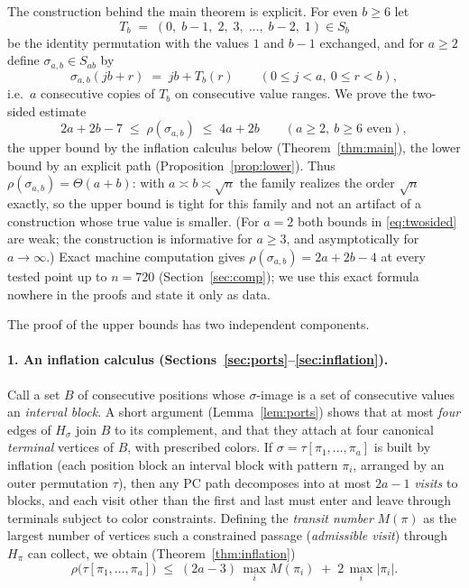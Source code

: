 \documentclass[11pt]{article}
\theoremstyle{definition}
\begin{document}
The construction behind the main theorem is explicit. For even $b\ge 6$ let
\[
T_b \;=\; (0,\; b{-}1,\; 2,\; 3,\; \dots,\; b{-}2,\; 1) \in S_b
\]
be the identity permutation with the values $1$ and $b-1$ exchanged, and for $a \ge 2$
define $\sigma_{a,b} \in S_{ab}$ by
\[
\sigma_{a,b}(jb + r) \;=\; jb + T_b(r) \qquad (0 \le j < a,\ 0 \le r < b),
\]
i.e.\ $a$ consecutive copies of $T_b$ on consecutive value ranges. We prove the
two-sided estimate
\begin{equation}\label{eq:twosided}
2a + 2b - 7 \;\le\; \rho(\sigma_{a,b}) \;\le\; 4a + 2b
\qquad (a \ge 2,\ b \ge 6 \text{ even}),
\end{equation}
the upper bound by the inflation calculus below
(Theorem~\ref{thm:main}), the lower bound by an
explicit path (Proposition~\ref{prop:lower}). Thus $\rho(\sigma_{a,b}) = \Theta(a+b)$:
with $a \asymp b \asymp \sqrt n$ the family realizes the order $\sqrt n$ exactly, so
the upper bound is tight for this family and not an artifact of a construction whose
true value is smaller. (For $a = 2$ both bounds in \eqref{eq:twosided} are weak; the
construction is informative for $a \ge 3$, and asymptotically for $a \to \infty$.)
Exact machine computation gives $\rho(\sigma_{a,b}) = 2a + 2b - 4$ at every tested
point up to $n = 720$ (Section~\ref{sec:comp}); we use this exact formula nowhere in
the proofs and state it only as data.

The proof of the upper bounds has two independent components.

\paragraph{1. An inflation calculus (Sections~\ref{sec:ports}--\ref{sec:inflation}).}
Call a set $B$ of consecutive positions whose $\sigma$-image is a set of consecutive
values an \emph{interval block}. A short argument (Lemma~\ref{lem:ports}) shows that at
most \emph{four} edges of $H_\sigma$ join $B$ to its complement, and that they attach
at four canonical \emph{terminal} vertices of $B$, with prescribed colors. If
$\sigma = \tau[\pi_1,\dots,\pi_a]$ is built by inflation (each position block an
interval block with pattern $\pi_i$, arranged by an outer permutation $\tau$), then any
PC path decomposes into at most $2a-1$ \emph{visits} to blocks, and each visit other
than the first and last must enter and leave through terminals subject to color
constraints. Defining the \emph{transit number} $M(\pi)$ as the largest number of
vertices such a constrained passage (\emph{admissible visit}) through $H_\pi$ can
collect, we obtain (Theorem~\ref{thm:inflation})
\[
\rho\bigl(\tau[\pi_1,\dots,\pi_a]\bigr) \;\le\; (2a-3)\,\max_i M(\pi_i) \;+\;
2\,\max_i |\pi_i| .
\]
\end{document}

